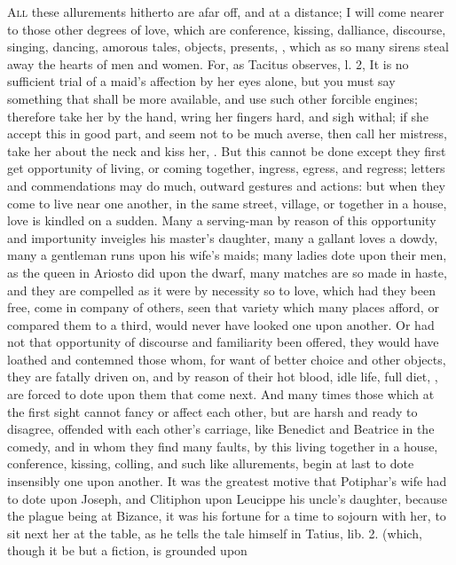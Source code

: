 {\lettrine{A}{ll} these allurements hitherto are afar off, and at a distance; I will
come nearer to those other degrees of love, which are conference,
kissing, dalliance, discourse, singing, dancing, amorous tales,
objects, presents, \etc{}, which as so many sirens steal away the hearts
of men and women. For, as Tacitus observes, l. 2, It is no
sufficient trial of a maid's affection by her eyes alone, but you must
say something that shall be more available, and use such other forcible
engines; therefore take her by the hand, wring her fingers hard, and
sigh withal; if she accept this in good part, and seem not to be much
averse, then call her mistress, take her about the neck and kiss her,
\etc{}. But this cannot be done except they first get opportunity of
living, or coming together, ingress, egress, and regress; letters and
commendations may do much, outward gestures and actions: but when they
come to live near one another, in the same street, village, or together
in a house, love is kindled on a sudden. Many a serving-man by reason
of this opportunity and importunity inveigles his master's daughter,
many a gallant loves a dowdy, many a gentleman runs upon his wife's
maids; many ladies dote upon their men, as the queen in Ariosto did
upon the dwarf, many matches are so made in haste, and they are
compelled as it were by necessity so to love, which had they been
free, come in company of others, seen that variety which many places
afford, or compared them to a third, would never have looked one upon
another. Or had not that opportunity of discourse and familiarity been
offered, they would have loathed and contemned those whom, for want of
better choice and other objects, they are fatally driven on, and by
reason of their hot blood, idle life, full diet, \etc{}, are forced to
dote upon them that come next. And many times those which at the first
sight cannot fancy or affect each other, but are harsh and ready to
disagree, offended with each other's carriage, like Benedict and
Beatrice in the comedy, and in whom they find many faults, by
this living together in a house, conference, kissing, colling, and such
like allurements, begin at last to dote insensibly one upon another.
It was the greatest motive that Potiphar's wife had to dote upon
Joseph, and Clitiphon upon Leucippe his uncle's daughter, because
the plague being at Bizance, it was his fortune for a time to sojourn
with her, to sit next her at the table, as he tells the tale himself in
Tatius, lib. 2. (which, though it be but a fiction, is grounded upon
}
